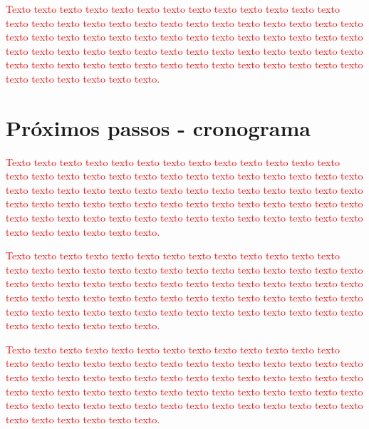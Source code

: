\documentclass[normaltoc, espacoumemeio, pnumromarab,ruledheader]{abnt}
\begin{document}
\textcolor{red}{Texto texto texto texto texto texto texto texto texto texto texto texto texto texto texto texto texto texto texto texto texto texto texto texto texto texto texto texto texto texto texto texto texto texto texto texto texto texto texto texto texto texto texto texto texto texto texto texto texto texto texto texto texto texto texto texto texto texto texto texto texto texto texto texto texto texto texto texto texto texto texto texto texto texto texto.}

\section{Próximos passos - cronograma}

\textcolor{red}{Texto texto texto texto texto texto texto texto texto texto texto texto texto texto texto texto texto texto texto texto texto texto texto texto texto texto texto texto texto texto texto texto texto texto texto texto texto texto texto texto texto texto texto texto texto texto texto texto texto texto texto texto texto texto texto texto texto texto texto texto texto texto texto texto texto texto texto texto texto texto texto texto texto texto texto.}

\textcolor{red}{Texto texto texto texto texto texto texto texto texto texto texto texto texto texto texto texto texto texto texto texto texto texto texto texto texto texto texto texto texto texto texto texto texto texto texto texto texto texto texto texto texto texto texto texto texto texto texto texto texto texto texto texto texto texto texto texto texto texto texto texto texto texto texto texto texto texto texto texto texto texto texto texto texto texto texto.}

\textcolor{red}{Texto texto texto texto texto texto texto texto texto texto texto texto texto texto texto texto texto texto texto texto texto texto texto texto texto texto texto texto texto texto texto texto texto texto texto texto texto texto texto texto texto texto texto texto texto texto texto texto texto texto texto texto texto texto texto texto texto texto texto texto texto texto texto texto texto texto texto texto texto texto texto texto texto texto texto.}
	

%


\end{document}

